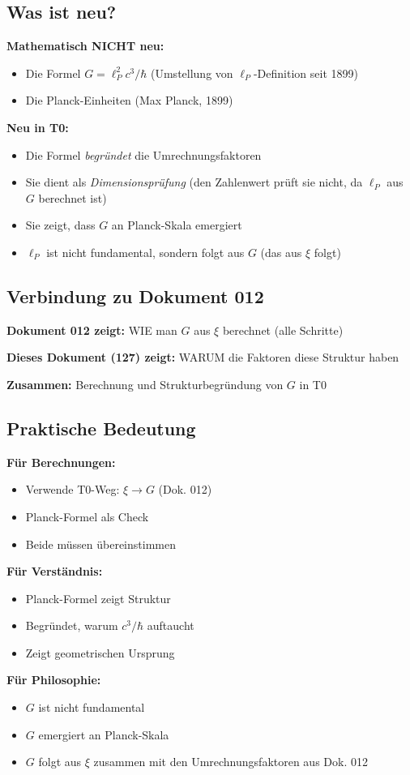	\subsection{Was ist neu?}
	
	\textbf{Mathematisch NICHT neu:}
	\begin{itemize}
		\item Die Formel $G = \ell_P^2 c^3/\hbar$ (Umstellung von $\ell_P$-Definition seit 1899)
		\item Die Planck-Einheiten (Max Planck, 1899)
	\end{itemize}
	
	\textbf{Neu in T0:}
	\begin{itemize}
		\item Die Formel \textit{begründet} die Umrechnungsfaktoren
		\item Sie dient als \textit{Dimensionsprüfung} (den Zahlenwert prüft sie nicht, da $\ell_P$ aus $G$ berechnet ist)
		\item Sie zeigt, dass $G$ an Planck-Skala emergiert
		\item $\ell_P$ ist nicht fundamental, sondern folgt aus $G$ (das aus $\xi$ folgt)
	\end{itemize}
	
	\subsection{Verbindung zu Dokument 012}
	
	\textbf{Dokument 012 zeigt:} WIE man $G$ aus $\xi$ berechnet (alle Schritte)
	
	\textbf{Dieses Dokument (127) zeigt:} WARUM die Faktoren diese Struktur haben
	
	\textbf{Zusammen:} Berechnung und Strukturbegründung von $G$ in T0
	
	\subsection{Praktische Bedeutung}
	
	\textbf{Für Berechnungen:}
	\begin{itemize}
		\item Verwende T0-Weg: $\xi \to G$ (Dok. 012)
		\item Planck-Formel als Check
		\item Beide müssen übereinstimmen
	\end{itemize}
	
	\textbf{Für Verständnis:}
	\begin{itemize}
		\item Planck-Formel zeigt Struktur
		\item Begründet, warum $c^3/\hbar$ auftaucht
		\item Zeigt geometrischen Ursprung
	\end{itemize}
	
	\textbf{Für Philosophie:}
	\begin{itemize}
		\item $G$ ist nicht fundamental
		\item $G$ emergiert an Planck-Skala
		\item $G$ folgt aus $\xi$ zusammen mit den Umrechnungsfaktoren aus Dok. 012
	\end{itemize}
	